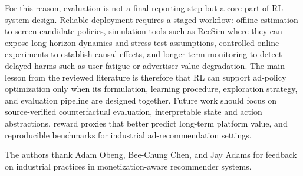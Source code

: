 \documentclass[manuscript,review,screen]{acmart}
\begin{document}
For this reason, evaluation is not a final reporting step but a core part of RL system design. Reliable deployment requires a staged workflow: offline estimation to screen candidate policies, simulation tools such as RecSim where they can expose long-horizon dynamics and stress-test assumptions, controlled online experiments to establish causal effects, and longer-term monitoring to detect delayed harms such as user fatigue or advertiser-value degradation. The main lesson from the reviewed literature is therefore that RL can support ad-policy optimization only when its formulation, learning procedure, exploration strategy, and evaluation pipeline are designed together. Future work should focus on source-verified counterfactual evaluation, interpretable state and action abstractions, reward proxies that better predict long-term platform value, and reproducible benchmarks for industrial ad-recommendation settings.


\begin{acks}
The authors thank Adam Obeng, Bee-Chung Chen, and Jay Adams for feedback on industrial practices in monetization-aware recommender systems.
\end{acks}


% 



% 


\end{document}

